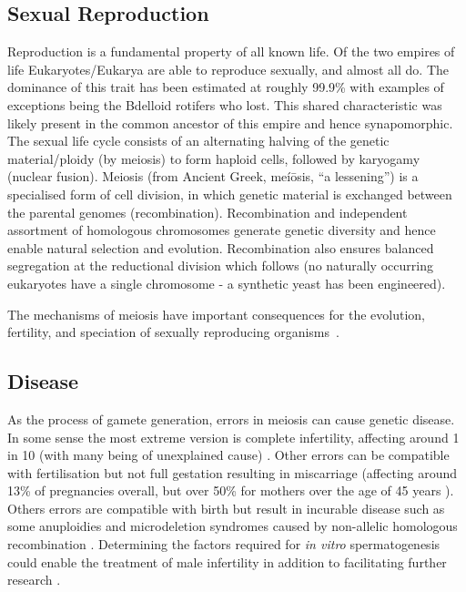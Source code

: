 \subsection{Sexual Reproduction}
Reproduction is a fundamental property of all known life. Of the two empires of life Eukaryotes/Eukarya are able to reproduce sexually, and almost all do. The dominance of this trait has been estimated at roughly 99.9\% with examples of exceptions being the Bdelloid rotifers who lost. This shared characteristic was likely present in the common ancestor of this empire and hence synapomorphic. The sexual life cycle consists of an alternating halving of the genetic material/ploidy (by meiosis) to form haploid cells, followed by karyogamy (nuclear fusion). Meiosis (from Ancient Greek, meíōsis, “a lessening”) is a specialised form of cell division, in which genetic material is exchanged between the parental genomes (recombination). Recombination and independent assortment of homologous chromosomes generate genetic diversity and hence enable natural selection and evolution. Recombination also ensures balanced segregation at the reductional division which follows (no naturally occurring eukaryotes have a single chromosome - a synthetic yeast has been engineered).

\cite{White1978Modes}


The mechanisms of meiosis have important consequences for the evolution, fertility, and speciation of sexually reproducing organisms~\cite{Davies2016Reengineering,Hassold2007Origin}. 


\subsection{Disease}
As the process of gamete generation, errors in meiosis can cause genetic disease. In some sense the most extreme version is complete infertility, affecting around 1 in 10 (with many being of unexplained cause) \parencite{Datta2016Prevalence, Hamada2011Unexplained}. Other errors can be compatible with fertilisation but not full gestation resulting in miscarriage (affecting around 13\% of pregnancies overall, but over 50\% for mothers over the age of 45 years \parencite{Magnus2019Role}). Others errors are compatible with birth but result in incurable disease such as some anuploidies \parencite{Hassold2007Origin} and microdeletion syndromes caused by non-allelic homologous recombination \parencite{X}. Determining the factors required for \emph{in vitro} spermatogenesis could enable the treatment of male infertility in addition to facilitating further research \parencite{Zhou2016Complete}.

